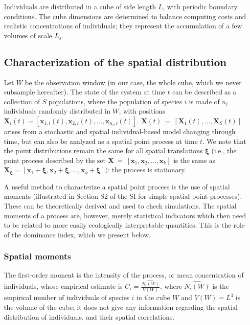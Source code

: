 \documentclass[12pt,english]{article}
\newcommand{\bx}{\boldsymbol{x}}
\newcommand{\bxi}{\boldsymbol{\xi} }
\begin{document}
Individuals are distributed in a cube of side length $L$, with periodic
boundary conditions. The cube dimensions are determined to balance
computing costs and realistic concentrations of individuals; they
represent the accumulation of a few volumes of scale $L_{s}$.

\subsection*{Characterization of the spatial distribution}

Let $W$ be the observation window (in our case, the whole cube, which
we never subsample hereafter). The state of the system at time $t$
can be described as a collection of $S$ populations, where the population
of species $i$ is made of $n_{i}$ individuals randomly distributed
in $W$, with positions $\boldsymbol{X}_{i}(t)=[\bx_{1,i}(t),\bx_{2,i}(t),\ldots, \bx_{n_{i},i}(t)]$.
$\boldsymbol{X}(t)~=~[\boldsymbol{X}_{1}(t),\ldots,\boldsymbol{X}_{S}(t)]$
arises from a stochastic and spatial individual-based model changing
through time, but can also be analyzed as a spatial point process
at time $t$. We note that the point distributions remain the same
for all spatial translations $\bxi$ (i.e., the point process described
by the set $\boldsymbol{X}~=~[\bx_{1},\bx_{2},\ldots,\bx_{k}]$ is the same
as $\boldsymbol{X_{\xi}}=[\bx_{1}+\bxi,\bx_{2}+\bxi,\ldots,\bx_{k}+\bxi])$:
the process is stationary.

A useful method to characterize a spatial point process is the use
of spatial moments (illustrated in Section S2 of the SI for simple
spatial point processes). These can be theoretically derived and used
to check simulations. The spatial moments of a process are, however,
merely statistical indicators which then need to be related to more
easily ecologically interpretable quantities. This is the role of
the dominance index, which we present below.

\subsubsection*{Spatial moments}

The first-order moment is the intensity of the process, or mean concentration
of individuals, whose empirical estimate is $C_{i}=\frac{\widehat{N_{i}(W)}}{V(W)}$,
where $\widehat{N_{i}(W)}$ is the empirical number of individuals
of species $i$ in the cube $W$ and $V(W)=L^{3}$ is the volume of
the cube; it does not give any information regarding the spatial distribution
of individuals, and their spatial correlations.
\end{document}
